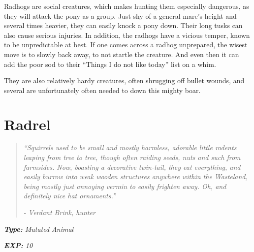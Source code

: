 \documentclass[11pt,a4paper,twocolumn]{book}
\begin{document}
	Radhogs are social creatures, which makes hunting them especially dangerous, as they will attack the pony as a group. Just shy of a general mare's height and several times heavier, they can easily knock a pony down. Their long tusks can also cause serious injuries. 
	In addition, the radhogs have a vicious temper, known to be unpredictable at best. If one comes across a radhog unprepared, the wisest move is to slowly back away, to not startle the creature. And even then it can add the poor sod to their ``Things I do not like today'' list on a whim.
	
	They are also relatively hardy creatures, often shrugging off bullet wounds, and several are unfortunately often needed to down this mighty boar.
	
	\clearpage
	
	\section*{Radrel}
	\begin{quote}
		\emph{``Squirrels used to be small and mostly harmless, adorable little rodents leaping from tree to tree, though often raiding seeds, nuts and such from farmsides. Now, boasting a decorative twin-tail, they eat everything, and easily burrow into weak wooden structures anywhere within the Wasteland, being mostly just annoying vermin to easily frighten away. Oh, and definitely nice hat ornaments.''}
		
		\emph{-	Verdant Brink, hunter}
	\end{quote}
	
	\emph{\textbf{Type:} Mutated Animal}
	
	\emph{\textbf{EXP:} 10}
	
%		
%	
%		
\end{document}
